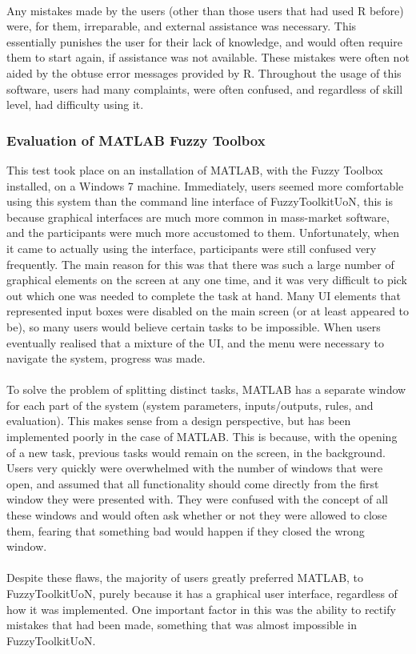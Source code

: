 \ \\
Any mistakes made by the users (other than those users that had used R before) were, for them, irreparable, and external assistance was necessary. This essentially punishes the user for their lack of knowledge, and would often require them to start again, if assistance was not available. These mistakes were often not aided by the obtuse error messages provided by R. Throughout the usage of this software, users had many complaints, were often confused, and regardless of skill level, had difficulty using it.


\newpage 

\subsubsection{Evaluation of MATLAB Fuzzy Toolbox} 	
This test took place on an installation of MATLAB, with the Fuzzy Toolbox installed, on a Windows 7 machine. Immediately, users seemed more comfortable using this system than the command line interface of FuzzyToolkitUoN, this is because graphical interfaces are much more common in mass-market software, and the participants were much more accustomed to them. Unfortunately, when it came to actually using the interface, participants were still confused very frequently. The main reason for this was that there was such a large number of graphical elements on the screen at any one time, and it was very difficult to pick out which one was needed to complete the task at hand. Many UI elements that represented input boxes were disabled on the main screen (or at least appeared to be), so many users would believe certain tasks to be impossible. When users eventually realised that a mixture of the UI, and the menu were necessary to navigate the system, progress was made.\ \\
\ \\
To solve the problem of splitting distinct tasks, MATLAB has a separate window for each part of the system (system parameters, inputs/outputs, rules, and evaluation). This makes sense from a design perspective, but has been implemented poorly in the case of MATLAB. This is because, with the opening of a new task, previous tasks would remain on the screen, in the background. Users very quickly were overwhelmed with the number of windows that were open, and assumed that all functionality should come directly from the first window they were presented with. They were confused with the concept of all these windows and would often ask whether or not they were allowed to close them, fearing that something bad would happen if they closed the wrong window.\ \\
\ \\
Despite these flaws, the majority of users greatly preferred MATLAB, to FuzzyToolkitUoN, purely because it has a graphical user interface, regardless of how it was implemented. One important factor in this was the ability to rectify mistakes that had been made, something that was almost impossible in FuzzyToolkitUoN.


